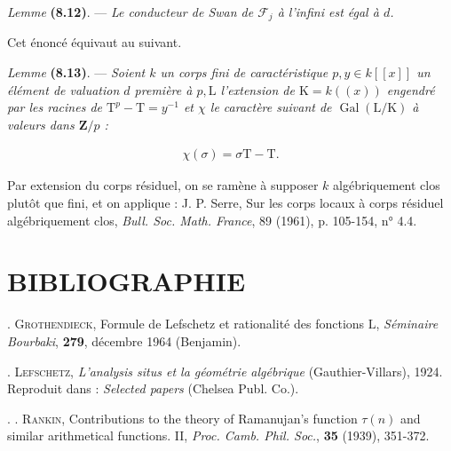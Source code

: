 \documentclass[10pt,leqno]{article}
\begin{document}
\noindent \emph{Lemme} \textbf{(8.12)}. — {\itshape Le conducteur de Swan de \(\mathcal{F} _{j}\) à l'infini est égal à \(d\).}\par

\noindent Cet énoncé équivaut au suivant.\par

\noindent \emph{Lemme} \textbf{(8.13)}. — {\itshape Soient \(k\) un corps fini de caractéristique \(p, y \in  k[[x]]\) un élément de valuation \(d\) première à \(p, \mathrm{L}\) l'extension de \(\mathrm{K} = k((x))\) engendré par les racines de \(\mathrm{T}^{p}-\mathrm{T} = y^{-1}\) et \(\chi \) le caractère suivant de \(\operatorname{Gal}(\mathrm{L}/\mathrm{K})\) à valeurs dans \(\mathbf{Z}/p\) :}\par

\begin{equation*}\begin{gathered}\chi (\sigma ) = \sigma \mathrm{T}-\mathrm{T}.\end{gathered}\end{equation*}

\par

\noindent Par extension du corps résiduel, on se ramène à supposer \(k\) algébriquement clos plutôt que fini, et on applique : J. P. Serre, Sur les corps locaux à corps résiduel algébriquement clos, \emph{Bull. Soc. Math. France}, 89 (1961), p. 105-154, n° 4.4.\par

\section*{BIBLIOGRAPHIE}

\noindent [\(1] \). \textsc{Grothendieck}, Formule de Lefschetz et rationalité des fonctions \(\mathrm{L}\), \emph{Séminaire Bourbaki}, \textbf{279}, décembre 1964 (Benjamin).\par

\noindent [\(2] \). \textsc{Lefschetz}, \emph{L'analysis situs et la géométrie algébrique} (Gauthier-Villars), 1924. Reproduit dans : \emph{Selected papers} (Chelsea Publ. Co.).\par

\noindent [\(3] . \). \textsc{Rankin}, Contributions to the theory of Ramanujan's function \(\tau (n)\) and similar arithmetical functions. II, \emph{Proc. Camb. Phil. Soc.}, \textbf{35} (1939), 351-372.\par
\end{document}
